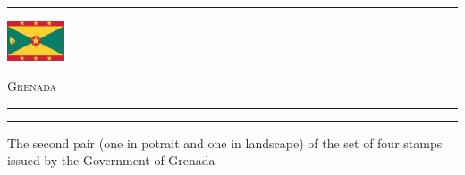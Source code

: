 \documentclass[a4paper]{article}
\begin{document}
\hrule
\vspace{8pt}
\begin{minipage}{2cm}
  \includegraphics[height=1.2cm]{images/gd}
\end{minipage}
\hfill
{\scshape\huge Grenada}
\vspace{8pt}
\hrule
\vspace{21cm}
\begin{center}
  \begin{minipage}{10cm}
    \hrule \vspace{12pt} The second pair (one in potrait and one in
    landscape) of the set of four stamps issued by the Government of
    Grenada
  \end{minipage}
\end{center}
\end{document}
